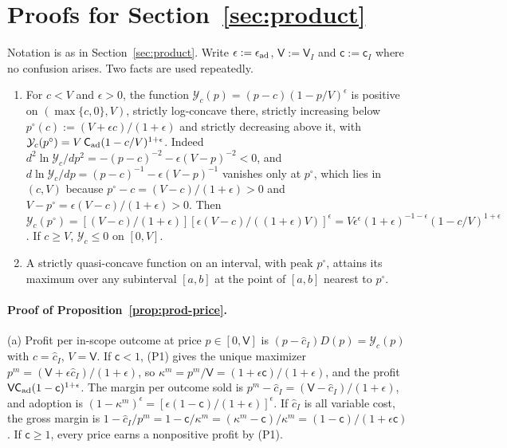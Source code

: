 \section{Proofs for Section~\ref{sec:product}}\label{app:proofs-product}

Notation is as in Section~\ref{sec:product}. Write $\epsilon:=\epsilon_{\rm ad}$, $\mathsf V:=\mathsf V_I$ and $\mathsf c:=\mathsf c_I$ where no confusion arises. Two facts are used repeatedly.

\begin{enumerate}
\item[(P1)] For $c<V$ and $\epsilon>0$, the function $\mathcal Y_c(p)=(p-c)(1-p/V)^{\epsilon}$ is positive on $(\max\{c,0\},V)$, strictly log-concave there, strictly increasing below $p^\circ(c):=(V+\epsilon c)/(1+\epsilon)$ and strictly decreasing above it, with $\mathcal Y_c(p^\circ)=V\,\mathsf C_{\rm ad}(1-c/V)^{1+\epsilon}$. Indeed $d^2\ln\mathcal Y_c/dp^2=-(p-c)^{-2}-\epsilon(V-p)^{-2}<0$, and $d\ln\mathcal Y_c/dp=(p-c)^{-1}-\epsilon(V-p)^{-1}$ vanishes only at $p^\circ$, which lies in $(c,V)$ because $p^\circ-c=(V-c)/(1+\epsilon)>0$ and $V-p^\circ=\epsilon(V-c)/(1+\epsilon)>0$. Then $\mathcal Y_c(p^\circ)=[(V-c)/(1+\epsilon)][\epsilon(V-c)/((1+\epsilon)V)]^{\epsilon}=V\epsilon^{\epsilon}(1+\epsilon)^{-1-\epsilon}(1-c/V)^{1+\epsilon}$. If $c\ge V$, $\mathcal Y_c\le 0$ on $[0,V]$.
\item[(P2)] A strictly quasi-concave function on an interval, with peak $p^\circ$, attains its maximum over any subinterval $[a,b]$ at the point of $[a,b]$ nearest to $p^\circ$.
\end{enumerate}

\paragraph{Proof of Proposition~\ref{prop:prod-price}.}
(a) Profit per in-scope outcome at price $p\in[0,\mathsf V]$ is $(p-\hat c_I)D(p)=\mathcal Y_c(p)$ with $c=\hat c_I$, $V=\mathsf V$. If $\mathsf c<1$, (P1) gives the unique maximizer $p^m=(\mathsf V+\epsilon\hat c_I)/(1+\epsilon)$, so $\kappa^m=p^m/\mathsf V=(1+\epsilon\mathsf c)/(1+\epsilon)$, and the profit $\mathsf V\mathsf C_{\rm ad}(1-\mathsf c)^{1+\epsilon}$. The margin per outcome sold is $p^m-\hat c_I=(\mathsf V-\hat c_I)/(1+\epsilon)$, and adoption is $(1-\kappa^m)^\epsilon=[\epsilon(1-\mathsf c)/(1+\epsilon)]^\epsilon$. If $\hat c_I$ is all variable cost, the gross margin is $1-\hat c_I/p^m=1-\mathsf c/\kappa^m=(\kappa^m-\mathsf c)/\kappa^m=(1-\mathsf c)/(1+\epsilon\mathsf c)$. If $\mathsf c\ge 1$, every price earns a nonpositive profit by (P1).

